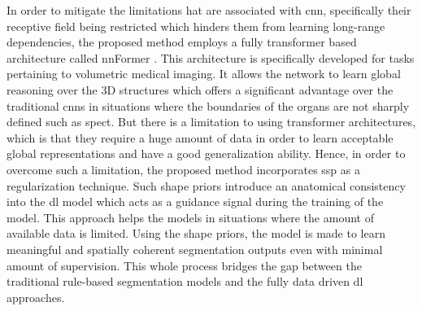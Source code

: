 In order to mitigate the limitations hat are associated with \gls{cnn}, specifically their receptive field being restricted which hinders them from learning long-range dependencies, the proposed method employs a fully transformer based architecture called nnFormer \cite{zhou2023nnformer}. This architecture is specifically developed for tasks pertaining to volumetric medical imaging. It allows the network to learn global reasoning over the 3D structures which offers a significant advantage over the traditional \gls{cnn}s in situations where the boundaries of the organs are not sharply defined such as \gls{spect}. But there is a limitation to using transformer architectures, which is that they require a huge amount of data in order to learn acceptable global representations and have a good generalization ability. Hence, in order to overcome such a limitation, the proposed method incorporates \gls{ssp} as a regularization technique. Such shape priors introduce an anatomical consistency into the \gls{dl} model which acts as a guidance signal during the training of the model. This approach helps the models in situations where the amount of available data is limited. Using the shape priors, the model is made to learn meaningful and spatially coherent segmentation outputs even with minimal amount of supervision. This whole process bridges the gap between the traditional rule-based segmentation models and the fully data driven \gls{dl} approaches.
